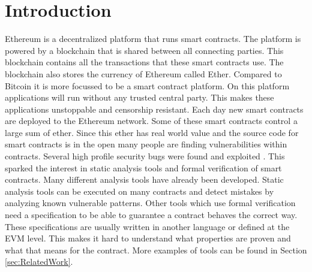 \documentclass[a4paper]{article}
\begin{document}
\section{Introduction}
Ethereum is a decentralized platform that runs smart contracts. The platform is powered by a blockchain that is shared between all connecting parties. This blockchain contains all the transactions that these smart contracts use. The blockchain also stores the currency of Ethereum called Ether. Compared to Bitcoin it is more focussed to be a smart contract platform. On this platform applications will run without any trusted central party. This makes these applications unstoppable and censorship resistant. Each day new smart contracts are deployed to the Ethereum network. Some of these smart contracts control a large sum of ether. Since this ether has real world value and the source code for smart contracts is in the open many people are finding vulnerabilities within contracts. Several high profile security bugs were found and exploited \cite{parity1, parity2,hkg,dao}. This sparked the interest in static analysis tools and formal verification of smart contracts. Many different analysis tools have already been developed. Static analysis tools can be executed on many contracts and detect mistakes by analyzing known vulnerable patterns. Other tools which use formal verification need a specification to be able to guarantee a contract behaves the correct way. These specifications are usually written in another language or defined at the EVM level. This makes it hard to understand what properties are proven and what that means for the contract. More examples of tools can be found in Section \ref{sec:RelatedWork}. 
\end{document}
